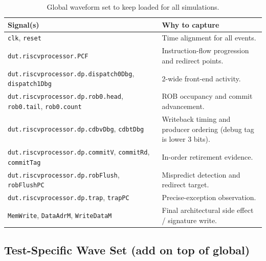 \documentclass[11pt]{article}
\begin{document}
\begin{table}[h]
  \centering
  \small
  \begin{tabular}{p{6.2cm} p{7.8cm}}
    \toprule
    \textbf{Signal(s)}                                                                & \textbf{Why to capture}                                             \\
    \midrule
    \texttt{clk}, \texttt{reset}                                                      & Time alignment for all events.                                      \\
    \texttt{dut.riscvprocessor.PCF}                                                   & Instruction-flow progression and redirect points.                   \\
    \texttt{dut.riscvprocessor.dp.dispatch0Dbg}, \texttt{dispatch1Dbg}                & 2-wide front-end activity.                                          \\
    \texttt{dut.riscvprocessor.dp.rob0.head}, \texttt{rob0.tail}, \texttt{rob0.count} & ROB occupancy and commit advancement.                               \\
    \texttt{dut.riscvprocessor.dp.cdbvDbg}, \texttt{cdbtDbg}                          & Writeback timing and producer ordering (debug tag is lower 3 bits). \\
    \texttt{dut.riscvprocessor.dp.commitV}, \texttt{commitRd}, \texttt{commitTag}     & In-order retirement evidence.                                       \\
    \texttt{dut.riscvprocessor.dp.robFlush}, \texttt{robFlushPC}                      & Mispredict detection and redirect target.                           \\
    \texttt{dut.riscvprocessor.dp.trap}, \texttt{trapPC}                              & Precise-exception observation.                                      \\
    \texttt{MemWrite}, \texttt{DataAdrM}, \texttt{WriteDataM}                         & Final architectural side effect / signature write.                  \\
    \bottomrule
  \end{tabular}
  \caption{Global waveform set to keep loaded for all simulations.}
  \label{tbl:waveform_global}
\end{table}

\subsection{Test-Specific Wave Set (add on top of global)}
\end{document}
